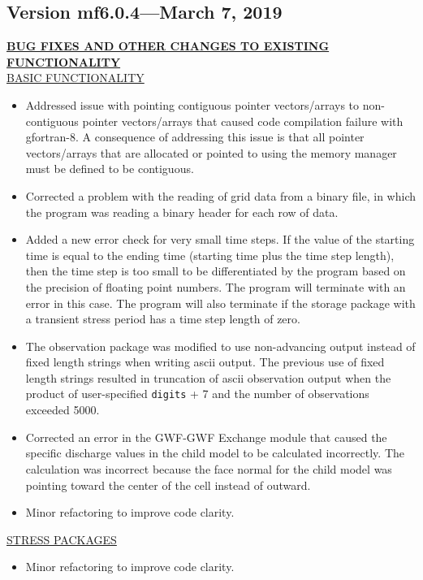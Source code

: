 	\subsection{Version mf6.0.4---March 7, 2019}
	
	\textbf{\underline{BUG FIXES AND OTHER CHANGES TO EXISTING FUNCTIONALITY}} \\
	\underline{BASIC FUNCTIONALITY}
	\begin{itemize}
		\item Addressed issue with pointing contiguous pointer vectors/arrays to non-contiguous pointer vectors/arrays that caused code compilation failure with gfortran-8. A consequence of addressing this issue is that all pointer vectors/arrays that are allocated or pointed to using the memory manager must be defined to be contiguous.
		\item Corrected a problem with the reading of grid data from a binary file, in which the program was reading a binary header for each row of data.
		\item Added a new error check for very small time steps.  If the value of the starting time is equal to the ending time (starting time plus the time step length), then the time step is too small to be differentiated by the program based on the precision of floating point numbers.  The program will terminate with an error in this case.  The program will also terminate if the storage package with a transient stress period has a time step length of zero.
		\item The observation package was modified to use non-advancing output instead of fixed length strings when writing ascii output. The previous use of fixed length strings resulted in truncation of ascii observation output when the product of user-specified \texttt{digits} + 7 and the number of observations exceeded 5000.
		\item Corrected an error in the GWF-GWF Exchange module that caused the specific discharge values in the child model to be calculated incorrectly.  The calculation was incorrect because the face normal for the child model was pointing toward the center of the cell instead of outward.
		\item Minor refactoring to improve code clarity.
	\end{itemize}
	
	\underline{STRESS PACKAGES}
	\begin{itemize}
		\item Minor refactoring to improve code clarity.
	\end{itemize}
	
